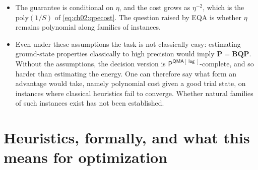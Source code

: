 \documentclass[handoutsbeamer.tex]{subfiles}
\begin{document}
\begin{frame}
\begin{itemize}\setlength\itemsep{0.3em}
    \item The guarantee is conditional on $\eta$, and the cost grows as $\eta^{-2}$, which is the $\mathrm{poly}(1/S)$ of \eqref{eq:ch02:qpecost}. The question raised by EQA is whether $\eta$ remains polynomial along families of instances.
    \item Even under these assumptions the task is not classically easy: estimating ground-state properties classically to high precision would imply $\mathbf P = \mathbf{BQP}$. Without the assumptions, the decision version is $\mathsf{P^{QMA[\log]}}$-complete, and so harder than estimating the energy. One can therefore say what form an advantage would take, namely polynomial cost given a good trial state, on instances where classical heuristics fail to converge. Whether natural families of such instances exist has not been established.
\end{itemize}
\end{frame}

\section{Heuristics, formally, and what this means for optimization}
\end{document}
